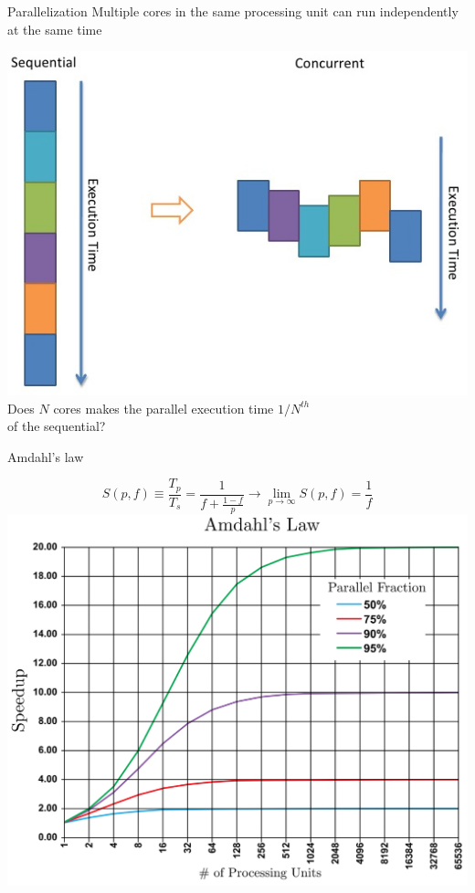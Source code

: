 \documentclass{beamer}
\begin{document}
\begin{frame}{Parallelization}
Multiple cores in the same processing unit can run independently at the same time
\begin{center}
\includegraphics[scale=0.4]{images/parallel.jpg}\\
Does \textbf{$N$} cores makes the parallel execution time \textbf{$1/N^{th}$}\\ of the sequential?
\end{center}
\end{frame}

\begin{frame}{Amdahl's law}
\begin{center}
\begin{equation}
S(p,f) \equiv \dfrac{T_p}{T_s} = \frac{1}{f + \frac{1-f}{p}} \rightarrow \lim_{p\to\infty} S(p,f) = \frac{1}{f}
\end{equation}
\includegraphics[scale=2.5]{images/amdahl.png}
\end{center}
\end{frame}
\end{document}
